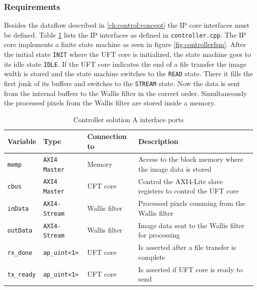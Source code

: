 \subsubsection*{Requirements}
Besides the dataflow described in \ref{ch:control:concept} the IP core
interfaces must be defined. Table \ref{tab:controlleraports} lists the IP
interfaces as defined in \texttt{controller.cpp}.
The IP core implements a finite state machine as seen in figure 
\ref{fig:controllerfsm}. After the initial state
\texttt{INIT} where the UFT core is initialized, the state machine goes to its
idle state \texttt{IDLE}. If the UFT core indicates the end of a file
transfer the image width is stored and the state machine switches to the 
\texttt{READ} state. There it fills the first junk of its buffers and
switches to the \texttt{STREAM} state. Now the data is sent from the
internal buffers to the Wallis filter in the correct order. Simultaneously the
processed pixels from the Wallis filter are stored inside a memory. 

\begin{table}[b!]
    \centering
    \begin{tabular}{l l l p{8cm}}
        \toprule
        Variable & Type & Connection to & Description \\
        \midrule
        \texttt{memp} & \texttt{AXI4 Master} & Memory &
        Access to the block memory where the image data is stored
        \\
        \texttt{cbus} & \texttt{AXI4 Master} \footnotemark & UFT core &
        Control the AXI4-Lite slave registers to control the UFT core
        \\
        \texttt{inData} & \texttt{AXI4-Stream} & Wallis filter &
        Processed pixels comming from the Wallis filter
        \\
        \texttt{outData} & \texttt{AXI4-Stream} & Wallis filter &
        Image data sent to the Wallis filter for processing
        \\
        \texttt{rx\_done} & \texttt{ap\_uint<1>} & UFT core &
        Is asserted after a file transfer is complete
        \\
        \texttt{tx\_ready} & \texttt{ap\_uint<1>} & UFT core &
        Is asserted if UFT core is ready to send
        \\
        \bottomrule
    \end{tabular}
    \caption{Controller solution A interface ports}
    \label{tab:controlleraports}
\end{table}

